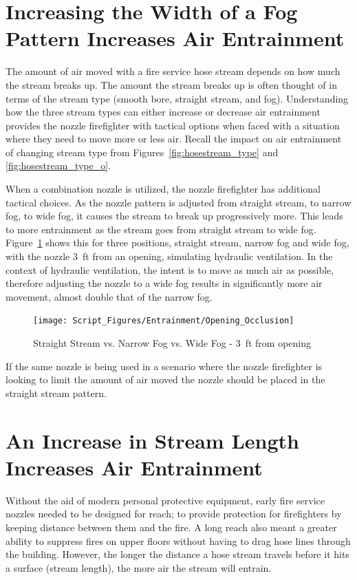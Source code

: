 \documentclass[12pt,oneside]{book}
\begin{document}
\section{Increasing the Width of a Fog Pattern Increases Air Entrainment}
The amount of air moved with a fire service hose stream depends on how much the stream breaks up. The amount the stream breaks up is often thought of in terms of the stream type (smooth bore, straight stream, and fog). Understanding how the three stream types can either increase or decrease air entrainment provides the nozzle firefighter with tactical options when faced with a situation where they need to move more or less air. Recall the impact on air entrainment of changing stream type from Figures~\ref{fig:hosestream_type} and \ref{fig:hosestream_type_o}.

When a combination nozzle is utilized, the nozzle firefighter has additional tactical choices. As the nozzle pattern is adjusted from straight stream, to narrow fog, to wide fog, it causes the stream to break up progressively more. This leads to more entrainment as the stream goes from straight stream to wide fog. Figure~\ref{fig:StraightStream_Fog_Comp} shows this for three positions, straight stream, narrow fog and wide fog, with the nozzle 3~ft from an opening, simulating hydraulic ventilation. In the context of hydraulic ventilation, the intent is to move as much air as possible, therefore adjusting the nozzle to a wide fog results in significantly more air movement, almost double that of the narrow fog.  

\begin{figure}[H]
\centering
\texttt{[image: Script\_Figures/Entrainment/Opening\_Occlusion]}
\caption{Straight Stream vs. Narrow Fog vs. Wide Fog - 3~ft from opening}
\label{fig:StraightStream_Fog_Comp}
\end{figure}

If the same nozzle is being used in a scenario where the nozzle firefighter is looking to limit the amount of air moved the nozzle should be placed in the straight stream pattern. 

\section{An Increase in Stream Length Increases Air Entrainment}
Without the aid of modern personal protective equipment, early fire service nozzles needed to be designed for reach; to provide protection for firefighters by keeping distance between them and the fire. A long reach also meant a greater ability to suppress fires on upper floors without having to drag hose lines through the building. However, the longer the distance a hose stream travels before it hits a surface (stream length), the more air the stream will entrain.
\end{document}
